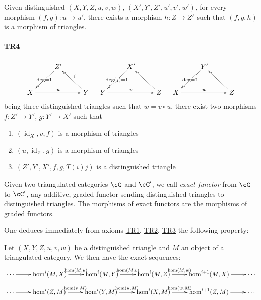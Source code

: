 Given distinguished $(X,Y,Z,u,v,w)$, $(X',Y',Z',u',v',w')$, for every
morphism $(f,g):u\to u'$, there exists a morphism $h:Z\to Z'$ such that $(f,g,h)$
is a morphism of triangles. 


\paragraph{TR4}
\hypertarget{VIII:TR4}{}

\[\xymatrix{
  & Z' \ar[dl]|{\deg=1} \\
  X \ar[rr]^-u 
    & & Y \ar[ul]_-i 
}\quad
\xymatrix{
  & X' \ar[dl]|{\deg(j)=1} \\
  Y \ar[rr]^-v 
    & & Z \ar[ul] 
}\quad
\xymatrix{
  & Y' \ar[dl]|{\deg=1} \\
  X \ar[rr]^-w 
    & & Z \ar[ul] 
}\]
being three distinguished triangles such that $w=v\circ u$, there exist two
morphisms $f:Z'\to Y'$, $g:Y' \to X'$ such that 
\begin{enumerate}
  \item $(\operatorname{id}_X, v, f)$ is a morphism of triangles
  \item $(u,\operatorname{id}_Z,g)$ is a morphism of triangles
  \item $(Z',Y',X',f,g,T(i) j)$ is a distinguished triangle
\end{enumerate}

Given two triangulated categories $\cC$ and $\cC'$, we call
\emph{exact functor} from $\cC$ to $\cC'$, any additive, graded functor
sending distinguished triangles to distinguished triangles. The
morphisms of exact functors are the morphisms of graded functors.

One deduces immediately from axioms \hyperlink{VIII:TR1}{TR1},
\hyperlink{VIII:TR2}{TR2}, \hyperlink{VIII:TR3}{TR3} the following property: 





\begin{proposition}\label{VIII:1-1-2}
Let $(X,Y,Z,u,v,w)$ be a distinguished triangle and $M$ an object of a
triangulated category. We then have the exact sequences: 
\[\xymatrix{
  \cdots \ar[r] 
    & \hom^i(M,X) \ar[r]^-{\hom(M,u)} 
    & \hom^i(M,Y) \ar[r]^-{\hom(M,v)} 
    & \hom^i(M,Z) \ar[r]^-{\hom(M,w)} 
    & \hom^{i+1}(M,X) \ar[r] 
    & \cdots
}\]
\[\xymatrix{
  \cdots \ar[r] 
    & \hom^i(Z,M) \ar[r]^-{\hom(v,M)} 
    & \hom^i(Y,M) \ar[r]^-{\hom(u,M)} 
    & \hom^i(X,M) \ar[r]^-{\hom(w,M)} 
    & \hom^{i+1}(Z,M) \ar[r] 
    & \cdots
}\]
\end{proposition}

